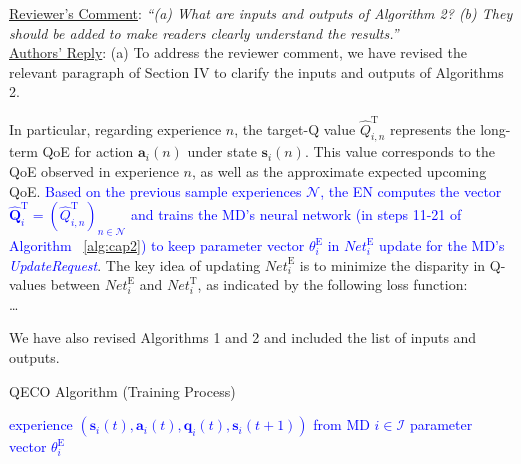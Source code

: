 \documentclass[12pt,draftclsnofoot,onecolumn]{IEEEtran}
\newcommand{\rev}[1]{{\color{blue}#1}} %
\newcommand{\rev}[1]{#1}
\newenvironment{my}[2]%
{\begin{list}{}%
{\setlength{\rightmargin}{#1}\setlength{\leftmargin}{#2}}%


 \item[]{}

} {\end{list}}
\begin{document}
\begin{enumerate}
	\item \underline{Reviewer's Comment}: 
	\textit{``(a) What are inputs and outputs of Algorithm 2? (b) They should be added to make readers clearly understand the results.''} \\\newline
	\underline{Authors' Reply}: (a) To address the reviewer comment, we have revised the relevant paragraph of Section IV to clarify the inputs and outputs of Algorithms 2.\newline
	
	\begin{my}{1cm}{1cm}
		\rev{In particular, regarding experience $n$, the target-Q value $\hat{Q}_{i,n}^{\text{T}}$ represents the long-term QoE for action $\boldsymbol{a}_i(n)$ under state $\boldsymbol{s}_i(n)$. This value corresponds to the QoE observed in experience $n$, as well as the approximate expected upcoming QoE. 
			\textcolor{blue}{Based on the previous sample experiences $\mathcal{N}$, the EN computes the vector $\hat{\mathbf{Q}}_i^{\text{T}} = (\hat{Q}^{\text{T}}_{i,n})_{n \in \mathcal{N}}$ and trains the MD's neural network (in steps 11-21 of Algorithm ~\ref{alg:cap2}) to keep parameter vector $\theta^{\text{E}}_i$ in $\textit{Net}_i^{\text{E}}$ update for the MD's \textit{UpdateRequest}}. The key idea of updating $\textit{Net}_i^{\text{E}}$ is to minimize the disparity in Q-values between $\textit{Net}_i^{\text{E}}$ and $\textit{Net}_i^{\text{T}}$, as indicated by the following loss function:\\ \dots}
	\end{my}
		
	We have also revised Algorithms 1 and 2 and included the list of inputs and outputs.\\	
	

\begin{my}{0.5cm}{0.5cm}	
\rev{\begin{minipage}[b]{0.87\textwidth} 
	\begin{algorithm}[H] \caption{QECO Algorithm (Training Process)}\label{alg:cap2} \centering 
		\begin{algorithmic}[1] \renewcommand{\algorithmicrequire}{\textbf{\textcolor{blue}{Input:}}} \renewcommand{\algorithmicensure}{\textbf{\textcolor{blue}{Output:}}} \Require \textcolor{blue}{experience $(\boldsymbol{s}_i(t), \boldsymbol{a}_i(t), \boldsymbol{q}_i(t), \boldsymbol{s}_i(t+1))$ from MD $i \in \mathcal{I}$} \Ensure \textcolor{blue}{parameter vector $\theta_i^{\text{E}}$} 
	\end{algorithmic} 
\end{algorithm} 
\end{minipage}
\vspace{5mm}

}
\end{my}
\end{enumerate}
\end{document}
